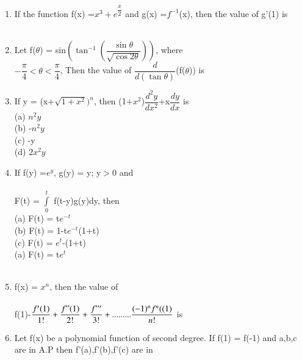 \begin{enumerate}[label=\arabic*.,ref=\thesubsection.\theenumi]
	\\
	\item If the function f(x) =$x^3 + e^{\dfrac{x}{2}}$ and g(x) =$f^{-1}$(x), then the value of g'(1) is\\
	\\
	\item Let f($\theta$) = sin$\left(\tan^{-1}\left(\dfrac{\sin \theta}{\sqrt{\cos2\theta}}\right)\right)$, where\\
	 $-\dfrac{\pi}{4}<\theta<\dfrac{\pi}{4}$, Then the value of $\dfrac{d}{d(\tan \theta)}$(f($\theta$)) is 
	\item If y = (x+$\sqrt{1+x^2})^n$, then (1+$x^2$)$\dfrac{d^2y}{dx^2}$+x$\dfrac{dy}{dx}$ is\\
	(a) $n^2y$\\
	(b) -$n^2y$\\
	(c) -y\\
	(d) $2x^2y$\\
	\item If f(y) =$e^y$, g(y) = y; y$>$0 and\\
	 \\
	 F(t) = $\int\limits_0^t$ f(t-y)g(y)dy, then\\
	 (a) F(t) = t$e^{-t}$\\
	 (b) F(t) = 1-t$e^{-t}$(1+t)\\
	 (c) F(t) = $e^{t}$-(1+t)\\
	 (a) F(t) = t$e^{t}$\\
	\\
	\item f(x) = $x^n$, then the value of\\
	\\
	f(1)-$\dfrac{f'(1)}{1!} + \dfrac{f"(1)}{2!} + \dfrac{f"'}{3!}+.........\dfrac{(-1)^n f^n((1)}{n!}$ is\\
	\begin{itemize}
	\begin{multicols}{4}
	\item [(a)]1
	\item [(b)]$2^n$
	\item [(c)]$2^n$-1
	\item [(d)]0
	
	\end{multicols}
	\end{itemize}
	\item Let f(x) be a polynomial function of second degree. If f(1) = f(-1) and a,b,c are in A.P then f'(a),f'(b),f'(c) are in\\
	

\end{enumerate}
